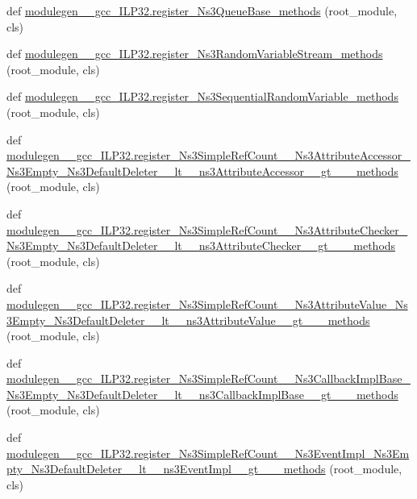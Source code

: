 \begin{DoxyCompactItemize}
\item 
def \hyperlink{namespacemodulegen____gcc__ILP32_ad688945a077f0f1240af7fcd93ae09ba}{modulegen\+\_\+\+\_\+gcc\+\_\+\+I\+L\+P32.\+register\+\_\+\+Ns3\+Queue\+Base\+\_\+methods} (root\+\_\+module, cls)
\item 
def \hyperlink{namespacemodulegen____gcc__ILP32_a8a007a5dc41faf281d3870b3feee4669}{modulegen\+\_\+\+\_\+gcc\+\_\+\+I\+L\+P32.\+register\+\_\+\+Ns3\+Random\+Variable\+Stream\+\_\+methods} (root\+\_\+module, cls)
\item 
def \hyperlink{namespacemodulegen____gcc__ILP32_a977006b47ef349be03ea356cf805516c}{modulegen\+\_\+\+\_\+gcc\+\_\+\+I\+L\+P32.\+register\+\_\+\+Ns3\+Sequential\+Random\+Variable\+\_\+methods} (root\+\_\+module, cls)
\item 
def \hyperlink{namespacemodulegen____gcc__ILP32_ac3ab36c44430c9b0f0301233bd18935b}{modulegen\+\_\+\+\_\+gcc\+\_\+\+I\+L\+P32.\+register\+\_\+\+Ns3\+Simple\+Ref\+Count\+\_\+\+\_\+\+Ns3\+Attribute\+Accessor\+\_\+\+Ns3\+Empty\+\_\+\+Ns3\+Default\+Deleter\+\_\+\+\_\+lt\+\_\+\+\_\+ns3\+Attribute\+Accessor\+\_\+\+\_\+gt\+\_\+\+\_\+\+\_\+methods} (root\+\_\+module, cls)
\item 
def \hyperlink{namespacemodulegen____gcc__ILP32_a8e35760026d969bed52bf02d5751f184}{modulegen\+\_\+\+\_\+gcc\+\_\+\+I\+L\+P32.\+register\+\_\+\+Ns3\+Simple\+Ref\+Count\+\_\+\+\_\+\+Ns3\+Attribute\+Checker\+\_\+\+Ns3\+Empty\+\_\+\+Ns3\+Default\+Deleter\+\_\+\+\_\+lt\+\_\+\+\_\+ns3\+Attribute\+Checker\+\_\+\+\_\+gt\+\_\+\+\_\+\+\_\+methods} (root\+\_\+module, cls)
\item 
def \hyperlink{namespacemodulegen____gcc__ILP32_ae37f0969d06fd5e11e962c9b2a58d222}{modulegen\+\_\+\+\_\+gcc\+\_\+\+I\+L\+P32.\+register\+\_\+\+Ns3\+Simple\+Ref\+Count\+\_\+\+\_\+\+Ns3\+Attribute\+Value\+\_\+\+Ns3\+Empty\+\_\+\+Ns3\+Default\+Deleter\+\_\+\+\_\+lt\+\_\+\+\_\+ns3\+Attribute\+Value\+\_\+\+\_\+gt\+\_\+\+\_\+\+\_\+methods} (root\+\_\+module, cls)
\item 
def \hyperlink{namespacemodulegen____gcc__ILP32_a1725745354fc64e505a347b59ad09428}{modulegen\+\_\+\+\_\+gcc\+\_\+\+I\+L\+P32.\+register\+\_\+\+Ns3\+Simple\+Ref\+Count\+\_\+\+\_\+\+Ns3\+Callback\+Impl\+Base\+\_\+\+Ns3\+Empty\+\_\+\+Ns3\+Default\+Deleter\+\_\+\+\_\+lt\+\_\+\+\_\+ns3\+Callback\+Impl\+Base\+\_\+\+\_\+gt\+\_\+\+\_\+\+\_\+methods} (root\+\_\+module, cls)
\item 
def \hyperlink{namespacemodulegen____gcc__ILP32_a8101c8d46fb3608fb9b8e22e680f1793}{modulegen\+\_\+\+\_\+gcc\+\_\+\+I\+L\+P32.\+register\+\_\+\+Ns3\+Simple\+Ref\+Count\+\_\+\+\_\+\+Ns3\+Event\+Impl\+\_\+\+Ns3\+Empty\+\_\+\+Ns3\+Default\+Deleter\+\_\+\+\_\+lt\+\_\+\+\_\+ns3\+Event\+Impl\+\_\+\+\_\+gt\+\_\+\+\_\+\+\_\+methods} (root\+\_\+module, cls)

\end{DoxyCompactItemize}
